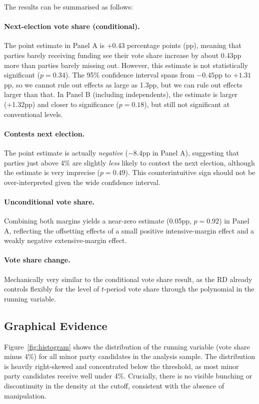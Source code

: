 \documentclass[12pt, a4paper]{article}
\begin{document}
The results can be summarised as follows:

\paragraph{Next-election vote share (conditional).} The point estimate in Panel A is +0.43 percentage points (pp), meaning that parties barely receiving funding see their vote share increase by about 0.43pp more than parties barely missing out. However, this estimate is not statistically significant ($p = 0.34$). The 95\% confidence interval spans from $-0.45$pp to $+1.31$pp, so we cannot rule out effects as large as 1.3pp, but we can rule out effects larger than that. In Panel B (including independents), the estimate is larger (+1.32pp) and closer to significance ($p = 0.18$), but still not significant at conventional levels.

\paragraph{Contests next election.} The point estimate is actually \emph{negative} ($-8.4$pp in Panel A), suggesting that parties just above 4\% are slightly \emph{less} likely to contest the next election, although the estimate is very imprecise ($p = 0.49$). This counterintuitive sign should not be over-interpreted given the wide confidence interval.

\paragraph{Unconditional vote share.} Combining both margins yields a near-zero estimate (0.05pp, $p = 0.92$) in Panel A, reflecting the offsetting effects of a small positive intensive-margin effect and a weakly negative extensive-margin effect.

\paragraph{Vote share change.} Mechanically very similar to the conditional vote share result, as the RD already controls flexibly for the level of $t$-period vote share through the polynomial in the running variable.

\subsection{Graphical Evidence}

Figure~\ref{fig:histogram} shows the distribution of the running variable (vote share minus 4\%) for all minor party candidates in the analysis sample. The distribution is heavily right-skewed and concentrated below the threshold, as most minor party candidates receive well under 4\%. Crucially, there is no visible bunching or discontinuity in the density at the cutoff, consistent with the absence of manipulation.
\end{document}
